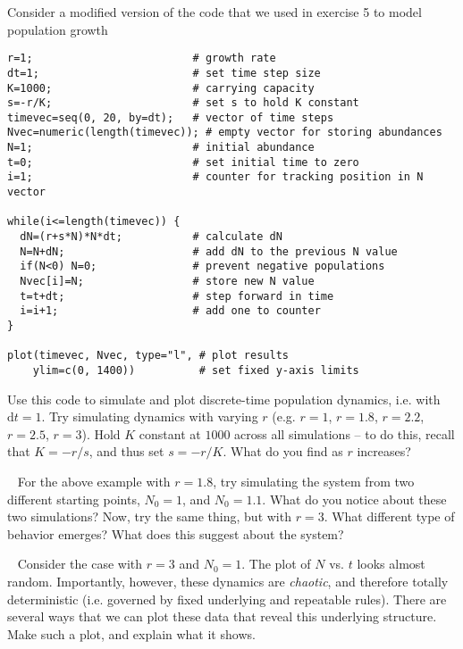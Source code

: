 \documentclass[12pt]{article}
\begin{document}
\date{}
\maketitle


\newline
Consider a modified version of the code that we used in exercise 5 to model population growth
\begin{verbatim}
r=1;					     # growth rate
dt=1;                        # set time step size
K=1000;                      # carrying capacity
s=-r/K;                      # set s to hold K constant
timevec=seq(0, 20, by=dt);   # vector of time steps
Nvec=numeric(length(timevec)); # empty vector for storing abundances
N=1;                         # initial abundance
t=0;                         # set initial time to zero
i=1;                         # counter for tracking position in N vector

while(i<=length(timevec)) {
  dN=(r+s*N)*N*dt;           # calculate dN
  N=N+dN;                    # add dN to the previous N value
  if(N<0) N=0;               # prevent negative populations
  Nvec[i]=N;                 # store new N value
  t=t+dt;                    # step forward in time
  i=i+1;                     # add one to counter
}

plot(timevec, Nvec, type="l", # plot results
	ylim=c(0, 1400))          # set fixed y-axis limits
\end{verbatim}
Use this code to simulate and plot discrete-time population dynamics, i.e. with $\mathrm{d}t = 1$. Try simulating dynamics with varying $r$ (e.g. $r=1$, $r=1.8$, $r=2.2$, $r=2.5$, $r=3$). Hold $K$ constant at $1000$ across all simulations -- to do this, recall that $K = -r/s$, and thus set $s = -r/K$. What do you find as $r$ increases?


~\newline
{}
\newline
For the above example with $r=1.8$, try simulating the system from two different starting points, $N_0 = 1$, and $N_0 = 1.1$. What do you notice about these two simulations? Now, try the same thing, but with $r=3$. What different type of behavior emerges? What does this suggest about the system?

~\newline
{}
\newline
Consider the case with $r=3$ and $N_0 = 1$. The plot of $N$ vs. $t$ looks almost random. Importantly, however, these dynamics are \textit{chaotic}, and therefore totally deterministic (i.e. governed by fixed underlying and repeatable rules). There are several ways that we can plot these data that reveal this underlying structure. Make such a plot, and explain what it shows.
\end{document}
